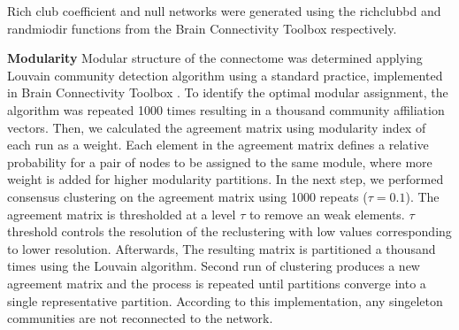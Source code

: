 \documentclass[10pt,letterpaper]{article}
\begin{document}
Rich club coefficient and null networks were generated using the rich\textunderscore club\textunderscore bd and randmio\textunderscore dir functions from the Brain Connectivity Toolbox \cite{Rubinov2010} respectively.


\textbf{Modularity}
Modular structure of the connectome was determined applying Louvain community detection algorithm using a standard practice, implemented in Brain Connectivity Toolbox \cite{Rubinov2010}. 
To identify the optimal modular assignment, the algorithm was repeated 1000 times resulting in a thousand community affiliation vectors. 
Then, we calculated the agreement matrix using modularity index of each run as a weight. 
Each element in the agreement matrix defines a relative probability for a pair of nodes to be assigned to the same module, where more weight is added for higher modularity partitions. 
In the next step, we performed consensus clustering on the agreement matrix using 1000 repeats ($\tau=0.1$). 
The agreement matrix is thresholded at a level $\tau$ to remove an weak elements. 
$\tau$ threshold controls the resolution of the reclustering with low values corresponding to lower resolution. 
Afterwards, The resulting matrix is partitioned a thousand times using the Louvain algorithm. 
Second run of clustering produces a new agreement matrix and the process is repeated until partitions converge into a single representative partition. 
According to this implementation, any singeleton communities are not reconnected to the network. 


\end{document}
